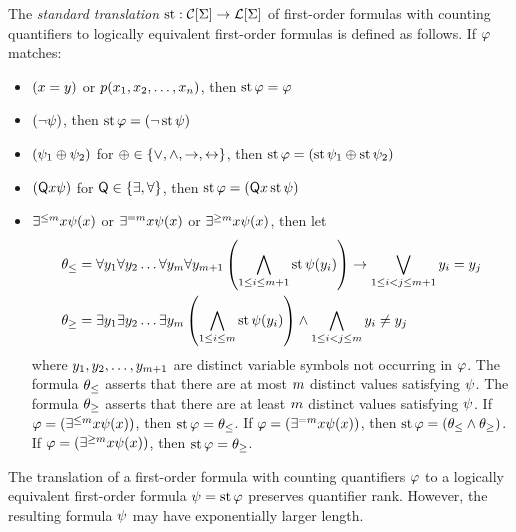 
The \emph{standard translation} $\operatorname{st} : \mathcal{C}[\mathrm{\Sigma}] \to \mathcal{L}[\mathrm{\Sigma}]$ of
first-order formulas with counting quantifiers to logically equivalent
first-order formulas is defined as follows. If $\varphi$ matches:
\begin{itemize}
  \item $(x = y)$ or $p(x_{1}, x_{2}, \dots, x_{n})$, then
  $\operatorname{st}\varphi = \varphi$
  \item $(\lnot\psi)$, then $\operatorname{st}\varphi = (\lnot\operatorname{st}\psi)$
  \item $(\psi_1 \oplus \psi_2)$ for $\oplus \in \left\{\lor,\land,\rightarrow,\leftrightarrow\right\}$, then
  $\operatorname{st}\varphi = (\operatorname{st}\psi_1 \oplus \operatorname{st}\psi_2)$
  \item $(\mathsf{Q}x \psi)$ for $\mathsf{Q} \in \left\{\exists, \forall\right\}$, then
  $\operatorname{st}\varphi = (\mathsf{Q}x \operatorname{st}\psi)$
  \item $\exists^{\leq m}x \psi(x)$ or $\exists^{=m}x \psi(x)$ or
  $\exists^{\geq m}x \psi(x)$, then let
  \begin{align*}
  \theta_\leq &= \forall y_{1} \forall y_{2} \dots \forall y_{m}
  \forall y_{m+1}
  \left(\bigwedge_{1 \leq i \leq m+1} \operatorname{st}\psi(y_{i})\right) \rightarrow
  \bigvee_{1 \leq i < j \leq m+1} y_{i} = y_{j} \\
  \theta_\geq &= \exists y_{1} \exists y_{2} \dots \exists y_{m}
  \left(\bigwedge_{1 \leq i \leq m} \operatorname{st}\psi(y_{i})\right) \land
  \bigwedge_{1 \leq i < j \leq m} y_{i} \neq y_{j}
  \end{align*}
  where $y_{1}, y_{2}, \dots, y_{m+1}$ are distinct variable symbols not
  occurring in $\varphi$. The formula $\theta_\leq$ asserts that there are at most
  $m$ distinct values satisfying $\psi$. The formula $\theta_\geq$ asserts
  that there are at least $m$ distinct values satisfying $\psi$.
  If $\varphi = (\exists^{\leq m}x \psi(x))$, then
  $\operatorname{st}\varphi = \theta_\leq$.
  If $\varphi = (\exists^{=m}x \psi(x))$, then
  $\operatorname{st}\varphi = (\theta_\leq \land \theta_\geq)$.
  If $\varphi = (\exists^{\geq m}x \psi(x))$, then
  $\operatorname{st}\varphi = \theta_\geq$.
\end{itemize}

\begin{remark}\label{rem:sttr-exp-size}
The translation of a first-order formula with counting quantifiers $\varphi$ to a
logically equivalent first-order formula $\psi = \operatorname{st}\varphi$ preserves
quantifier rank. However, the resulting formula $\psi$ may have exponentially
larger length.
\end{remark}